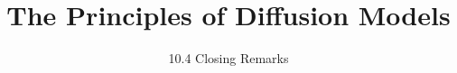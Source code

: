
\title{The Principles of Diffusion Models}
\subtitle{10.4 Closing Remarks}


\begin{frame}
    \titlepage
\end{frame}


